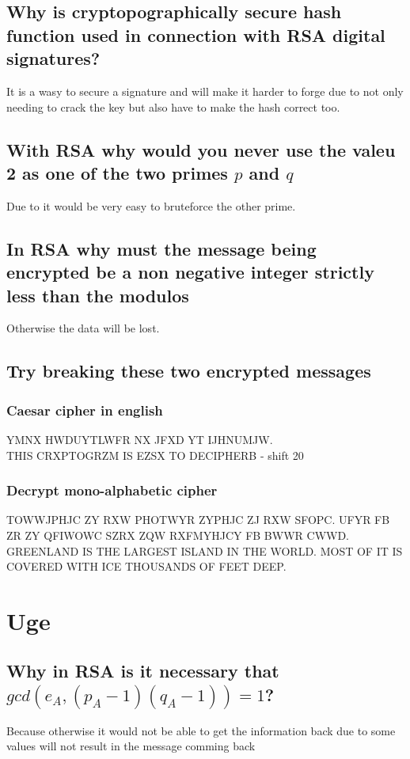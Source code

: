 \documentclass[12pt, a4paper]{article}
\begin{document}
	\subsection{Why is cryptopographically secure hash function used in connection with RSA digital signatures?}
		It is a wasy to secure a signature and will make it harder to forge due to not only needing to crack the key but also have to make the hash correct too.
	\subsection{With RSA why would you never use the valeu 2 as one of the two primes $p$ and $q$}
		Due to it would be very easy to bruteforce the other prime.
	\subsection{In RSA why must the message being encrypted be a non negative integer strictly less than the modulos}
		Otherwise the data will be lost.
	\setcounter{subsection}{0}
	\subsection{Try breaking these two encrypted messages}
		\subsubsection{Caesar cipher in english}
			YMNX HWDUYTLWFR NX JFXD YT IJHNUMJW.\\
			THIS CRXPTOGRZM IS EZSX TO DECIPHERB - shift 20
		\subsubsection{Decrypt mono-alphabetic cipher}
			TOWWJPHJC ZY RXW PHOTWYR ZYPHJC ZJ RXW SFOPC. UFYR FB ZR ZY QFIWOWC SZRX ZQW RXFMYHJCY FB BWWR CWWD.\\
			GREENLAND IS THE LARGEST ISLAND IN THE WORLD. MOST OF IT IS COVERED WITH ICE THOUSANDS OF FEET DEEP.
\section{Uge}
	\subsection{Why in RSA is it necessary that $gcd(e_A,(p_A-1)(q_A-1))=1$?}
		Because otherwise it would not be able to get the information back due to some values will not result in the message comming back
\end{document}
